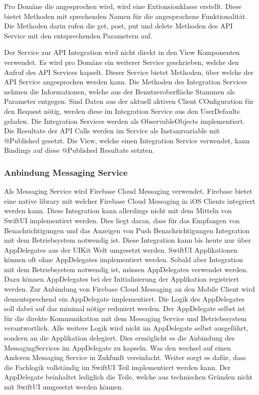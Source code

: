 Pro Domäne die angesprochen wird, wird eine Extionsionklasse erstellt.
Diese bietet Methoden mit sprechenden Namen für die angesprochene Funktionalität.
Die Methoden darin rufen die get, post, put und delete Methoden des API Service mit den entsprechenden Parametern auf.

Der Service zur API Integration wird nicht direkt in den View Komponenten verwendet.
Es wird pro Domäne ein weiterer Service geschrieben, welche den Aufruf des API Services kapselt.
Dieser Service bietet Methoden, über welche der API Service angesprochen werden kann.
Die Methoden des Integration Services nehmen die Informationen, welche aus der Benutzeroberfläche Stammen als Parameter entgegen.
Sind Daten aus der aktuell aktiven Client COnfiguration für den Request nötig, werden diese im Integration Service aus den UserDefaults geladen.
Die Integration Services werden als ObservableObjects implementiert.
Die Resultate der API Calls werden im Service als Instanzvariable mit @Published gesetzt.
Die View, welche einen Integration Service verwendet, kann Bindings auf diese @Published Resultate setzten.

\subsubsection{Anbindung Messaging Service}

Als Messaging Service wird Firebase Cloud Messaging verwendet.
Firebase bietet eine native library mit welcher Firebase Cloud Messaging in iOS Clients integriert werden kann.
Diese Integration kann allerdings nicht mit dem Mitteln von SwiftUI implementiert werden.
Dies liegt daran, dass für das Empfangen von Benachrichtigungen und das Anzeigen von Push Benachrichtigungen Integration mit dem Betriebsystem notwendig ist.
Diese Integration kann bis heute nur über AppDelegates aus der UIKit Welt umgesetzt werden.
SwiftUI Applikationen können oft ohne AppDelegates implementiert werden.
Sobald aber Integration mit dem Betriebsystem notwendig ist, müssen AppDelegates verwendet werden.
Dazu können AppDelegates bei der Initialisierung der Applikation registriert werden.
Zur Anbindung von Firebase Cloud Messaging an den Mobile Client wird dementsprechend ein AppDelegate implementiert.
Die Logik des AppDelegates soll dabei auf das minimal nötige reduziert werden.
Der AppDelegate selbst ist für die direkte Kommunikation mit dem Messaging Service und Betriebssystem verantwortlich.
Alle weitere Logik wird nicht im AppDelegate selbst ausgeführt, sondern an die Applikation delegiert.
Dies ermöglicht es die Anbindung des MessagingServices im AppDelegate zu kapseln.
Was den wechsel auf einen Anderen Messaging Service in Zukfunft vereinfacht.
Weiter sorgt es dafür, dass die Fachlogik vollständig im SwiftUI Teil implementiert werden kann.
Der AppDelegate beinhaltet lediglich die Teile, welche aus technischen Gründen nicht mit SwiftUI umgesetzt werden können.

